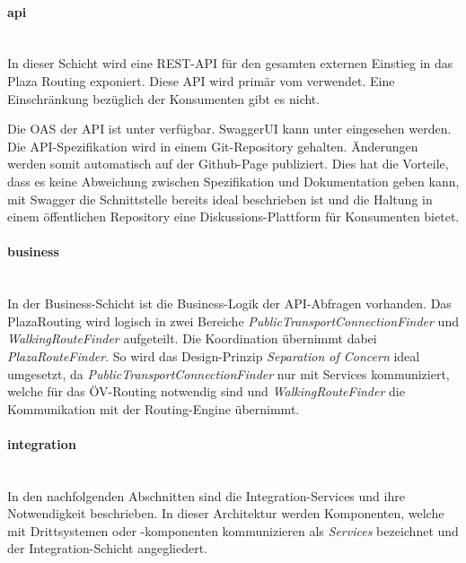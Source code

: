 \paragraph{api}\label{architektur:api-layer}~\\
In dieser Schicht wird eine \ac{REST}-\ac{API} für den gesamten externen Einstieg in das Plaza Routing exponiert. Diese \ac{API} wird primär vom  verwendet. Eine Einschränkung bezüglich der Konsumenten gibt es nicht.

Die \ac{OAS} \cite{open-api-specificaiton} der \ac{API} ist unter \cite{plaza-routing-api-spez} verfügbar. SwaggerUI kann unter \cite{plaza-routing-api-swaggerui} eingesehen werden. Die {API}-Spezifikation wird in einem Git-Repository gehalten. Änderungen werden somit automatisch auf der Github-Page \cite{plaza-routing-api-spez} publiziert. Dies hat die Vorteile, dass es keine Abweichung zwischen Spezifikation und Dokumentation geben kann, mit Swagger \cite{swagger} die Schnittstelle bereits ideal beschrieben ist und die Haltung in einem öffentlichen Repository eine Diskussions-Plattform für Konsumenten bietet.

\paragraph{business}\label{architektur:business-layer}~\\
In der Business-Schicht ist die Business-Logik der \ac{API}-Abfragen vorhanden. Das PlazaRouting wird logisch in zwei Bereiche \emph{PublicTransportConnectionFinder} und \emph{WalkingRouteFinder} aufgeteilt. Die Koordination übernimmt dabei \emph{PlazaRouteFinder}. So wird das Design-Prinzip \emph{Separation of Concern} ideal umgesetzt, da \emph{PublicTransportConnectionFinder} nur mit Services kommuniziert, welche für das ÖV-Routing notwendig sind und \emph{WalkingRouteFinder} die Kommunikation mit der Routing-Engine übernimmt.

\paragraph{integration}\label{architektur:integration-layer}~\\
In den nachfolgenden Abschnitten sind die Integration-Services und ihre Notwendigkeit beschrieben. In dieser Architektur werden Komponenten, welche mit Drittsystemen oder -komponenten kommunizieren als \emph{Services} bezeichnet und der Integration-Schicht angegliedert.

